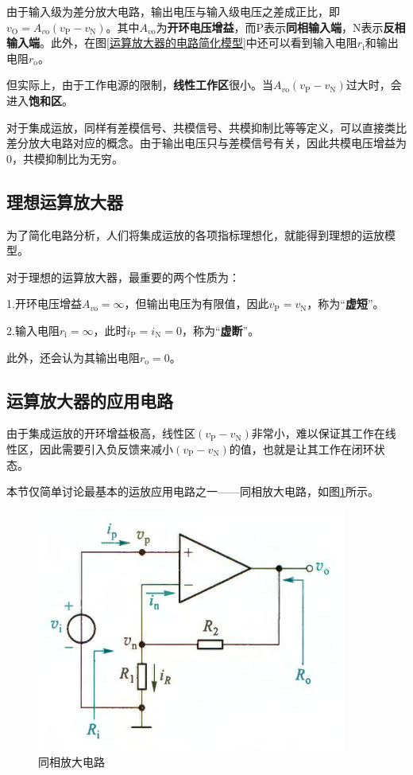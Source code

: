 由于输入级为差分放大电路，输出电压与输入级电压之差成正比，即$v_{\mathrm{O}}=A_{v\mathrm{o}}(v_{\mathrm{P}}-v_{\mathrm{N}})$。其中$A_{v\mathrm{o}}$为\textbf{开环电压增益}，而P表示\textbf{同相输入端}，N表示\textbf{反相输入端}。此外，在图\ref{运算放大器的电路简化模型}中还可以看到输入电阻$r_\mathrm{i}$和输出电阻$r_\mathrm{o}$。

但实际上，由于工作电源的限制，\textbf{线性工作区}很小。当$A_{v\mathrm{o}}(v_{\mathrm{P}}-v_{\mathrm{N}})$过大时，会进入\textbf{饱和区}。

对于集成运放，同样有差模信号、共模信号、共模抑制比等等定义，可以直接类比差分放大电路对应的概念。由于输出电压只与差模信号有关，因此共模电压增益为0，共模抑制比为无穷。

\subsection{理想运算放大器}
为了简化电路分析，人们将集成运放的各项指标理想化，就能得到理想的运放模型。

对于理想的运算放大器，最重要的两个性质为：

1.开环电压增益$A_{v\mathrm{o}}=\infty$，但输出电压为有限值，因此$v_{\mathrm{P}}=v_{\mathrm{N}}$，称为“\textbf{虚短}”。

2.输入电阻$r_{\mathrm{i}}=\infty$，此时$i_{\mathrm{P}}=i_{\mathrm{N}}=0$，称为“\textbf{虚断}”。

此外，还会认为其输出电阻$r_{\mathrm{o}}=0$。

\subsection{运算放大器的应用电路}
由于集成运放的开环增益极高，线性区$(v_{\mathrm{P}}-v_{\mathrm{N}})$非常小，难以保证其工作在线性区，因此需要引入负反馈来减小$(v_{\mathrm{P}}-v_{\mathrm{N}})$的值，也就是让其工作在闭环状态。

本节仅简单讨论最基本的运放应用电路之一——同相放大电路，如图\ref{同相放大电路}所示。

\begin{figure}[htb]
    \centering
    \includegraphics[width=0.45\linewidth]{pic/同相放大电路.png}
    \caption{同相放大电路\cite{康华光}\label{同相放大电路}}
\end{figure}

